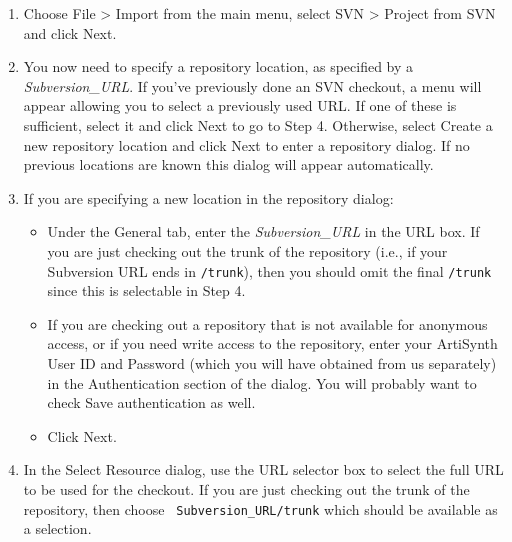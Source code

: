 \begin{enumerate}

\item Choose {\sf File > Import} from the main menu, select {\sf SVN >
Project from SVN} and click {\sf Next}.

\item You now need to specify a repository location, as specified by a
{\it Subversion\_URL}.  If you've previously done an SVN checkout, a
menu will appear allowing you to select a previously used URL. If one
of these is sufficient, select it and click {\sf Next} to go to Step
4. Otherwise, select {\sf Create a new repository location} and click
{\sf Next} to enter a repository dialog. If no previous locations are
known this dialog will appear automatically.

\item If you are specifying a new location in the repository dialog:

\begin{itemize}

\item Under the {\sf General} tab, enter the {\it Subversion\_URL} in the
{\sf URL} box. If you are just checking out the trunk of the
repository (i.e., if your Subversion URL ends in {\tt /trunk}), then
you should omit the final {\tt /trunk} since this is selectable in Step 4.

\item If you are checking out a repository that is not available for
anonymous access, or if you need write access to the repository, enter
your ArtiSynth User ID and Password (which you will have obtained from
us separately) in the {\sf Authentication} section of the dialog.
You will probably want to check {\sf Save authentication} as well.


\item Click {\sf Next}.

\end{itemize}

\item In the {\sf Select Resource} dialog, use the {\sf URL} selector
box to select the full URL to be used for the checkout. If you are
just checking out the trunk of the repository, then choose {\tt
Subversion\_URL/trunk} which should be available as a selection.


\end{enumerate}
